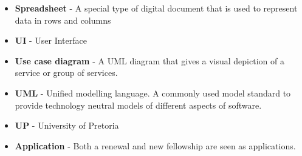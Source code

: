\begin{itemize}
\item \textbf{Spreadsheet} - A special type of digital document that is used to represent data in rows and columns
\item \textbf{UI} - User Interface
\item \textbf{Use case diagram} - A UML diagram that gives a visual depiction of a service or group of services.
\item \textbf{UML} - Unified modelling language. A commonly used model standard to provide technology neutral models of different aspects of software.
\item \textbf{UP} - University of Pretoria
\item \textbf{Application} - Both a renewal and new fellowship are seen as applications.

\end{itemize}		


\vspace{0.5in}
